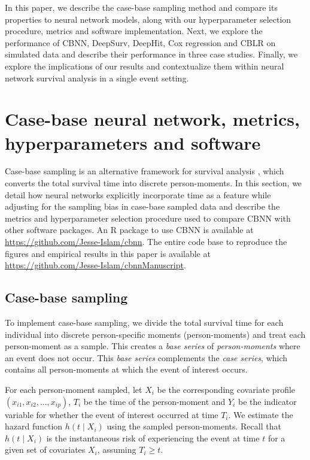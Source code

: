 \documentclass[preprint,12pt]{elsarticle}
\begin{document}
In this paper, we describe the case-base sampling method and compare its properties to neural
network models, along with our hyperparameter selection procedure,
metrics and software implementation. Next, we explore the performance of CBNN, DeepSurv,
DeepHit, Cox regression and CBLR on simulated data and
describe their performance in three case studies. Finally, we explore
the implications of our results and contextualize them within neural network survival analysis in a single
event setting.





\hypertarget{methods}{%
\section{Case-base neural network, metrics, hyperparameters and
software}\label{methods}}


Case-base sampling is an alternative framework for survival analysis \citep{hanley2009},
which converts the total survival time into discrete person-moments. In this section, we detail how neural
networks explicitly incorporate time as a feature while adjusting for the sampling bias in case-base
sampled data and describe the metrics and hyperparameter selection procedure used to compare
CBNN with other software packages. An R package to use CBNN is available at
\url{https://github.com/Jesse-Islam/cbnn}. The entire code base to reproduce the figures
and empirical results in this paper is available at \url{https://github.com/Jesse-Islam/cbnnManuscript}.

\hypertarget{case-base-sampling}{%
\subsection{Case-base sampling}\label{case-base-sampling}}

To implement case-base sampling, we divide the total survival time for each individual into discrete person-specific moments (person-moments) and treat each person-moment as a sample. This creates a \emph{base series} of
\emph{person-moments} where an event does not occur. This \emph{base series} complements the \emph{case series}, which contains
all person-moments at which the event of interest occurs.

For each person-moment sampled, let \(X_i\) be the corresponding covariate profile
\(\left(x_{i1},x_{i2},...,x_{ip} \right)\), \(T_i\) be the time of the person-moment and \(Y_i\) be the indicator
variable for whether the event of interest occurred at time \(T_i\). We estimate the hazard function
\(h(t \mid X_i)\) using the sampled person-moments. Recall that \(h(t \mid X_i)\) is the instantaneous
risk of experiencing the event at time \(t\) for a given set of covariates \(X_i\), assuming \(T_i \geq t\).
\end{document}
